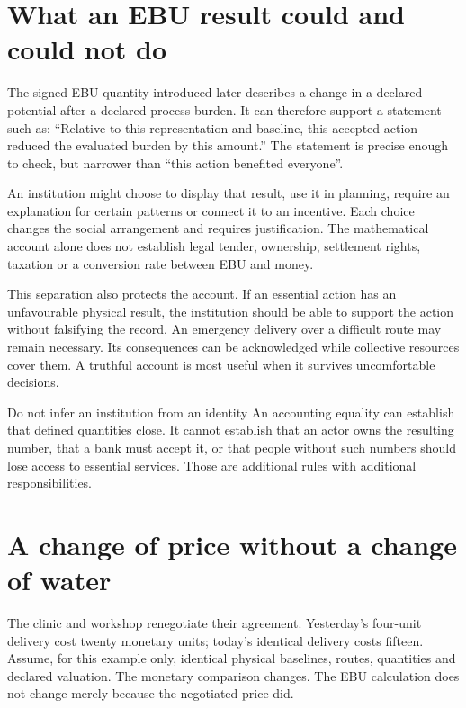 \section{What an EBU result could and could not do}
The signed EBU quantity introduced later describes a change in a declared potential after a declared process burden. It can therefore support a statement such as: ``Relative to this representation and baseline, this accepted action reduced the evaluated burden by this amount.'' The statement is precise enough to check, but narrower than ``this action benefited everyone''.

An institution might choose to display that result, use it in planning, require an explanation for certain patterns or connect it to an incentive. Each choice changes the social arrangement and requires justification. The mathematical account alone does not establish legal tender, ownership, settlement rights, taxation or a conversion rate between EBU and money.

This separation also protects the account. If an essential action has an unfavourable physical result, the institution should be able to support the action without falsifying the record. An emergency delivery over a difficult route may remain necessary. Its consequences can be acknowledged while collective resources cover them. A truthful account is most useful when it survives uncomfortable decisions.

\begin{cautionbox}{Do not infer an institution from an identity}
An accounting equality can establish that defined quantities close. It cannot establish that an actor owns the resulting number, that a bank must accept it, or that people without such numbers should lose access to essential services. Those are additional rules with additional responsibilities.
\end{cautionbox}

\section{A change of price without a change of water}
The clinic and workshop renegotiate their agreement. Yesterday's four-unit delivery cost twenty monetary units; today's identical delivery costs fifteen. Assume, for this example only, identical physical baselines, routes, quantities and declared valuation. The monetary comparison changes. The EBU calculation does not change merely because the negotiated price did.

